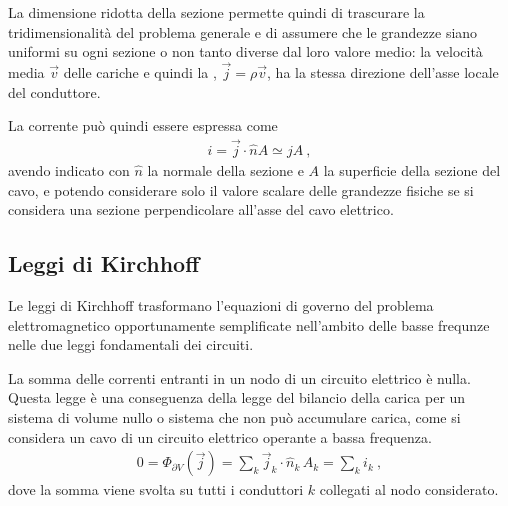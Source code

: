 \documentclass[letterpaper,10pt,italian]{jupyterBook}
\begin{document}
\sphinxAtStartPar
La dimensione ridotta della sezione permette quindi di trascurare la tridimensionalità del problema generale e di assumere che le grandezze siano uniformi su ogni sezione \sphinxhyphen{} o non tanto diverse dal loro valore medio: la velocità media  \(\vec{v}\) delle cariche e quindi la {\hyperref[\detokenize{ch/electromagnetism/electric-current:electric-current-density-def}]{}}, \(\vec{j} = \rho \vec{v}\), ha la stessa direzione dell’asse locale del conduttore.

\sphinxAtStartPar
La corrente può quindi essere espressa come
\begin{equation}\label{equation:ch/electromagnetism/circuits-electric:eq:cable:current-current-density}
\begin{split}i = \vec{j} \cdot \hat{n} A \simeq j A \ ,\end{split}
\end{equation}
\sphinxAtStartPar
avendo indicato con \(\hat{n}\) la normale della sezione e \(A\) la superficie della sezione del cavo, e potendo considerare solo il valore scalare delle grandezze fisiche se si considera una sezione perpendicolare all’asse del cavo elettrico.

\sphinxAtStartPar
{} 


\subsection{Leggi di Kirchhoff}
\label{\detokenize{ch/electromagnetism/circuits-electric:leggi-di-kirchhoff}}\label{\detokenize{ch/electromagnetism/circuits-electric:physics-hs-electromagnetism-circuits-electric-kirchhoff-laws}}
\sphinxAtStartPar
Le leggi di Kirchhoff trasformano l’equazioni di governo del problema elettromagnetico opportunamente semplificate nell’ambito delle basse frequnze nelle due leggi fondamentali dei circuiti.

\sphinxAtStartPar
{} La somma delle correnti entranti in un nodo di un circuito elettrico è nulla. Questa legge è una conseguenza della legge del bilancio della carica per un sistema di volume nullo \sphinxhyphen{} o sistema che non può accumulare carica, come si considera un cavo di un circuito elettrico operante a bassa frequenza.
\begin{equation*}
\begin{split}0 = \Phi_{\partial V}(\vec{j}) = \sum_{k} \vec{j}_k \cdot \hat{n}_k \, A_k = \sum_{k} i_k \ ,\end{split}
\end{equation*}
\sphinxAtStartPar
dove la somma viene svolta su tutti i conduttori \(k\) collegati al nodo considerato.
\end{document}

